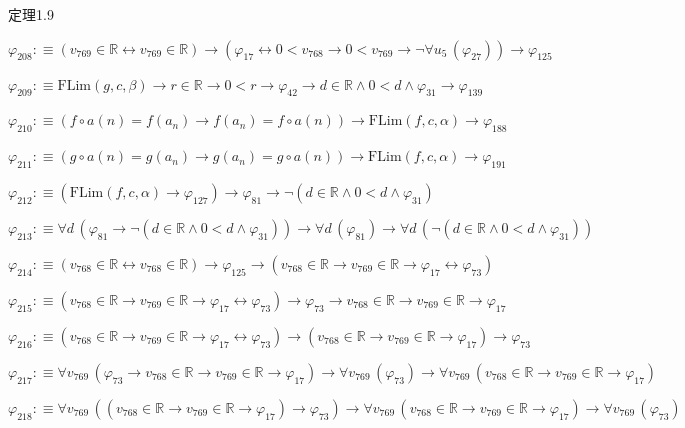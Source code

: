 \begin{fullproof}{定理1.9}
\begin{abbrevlist}
\item $\varphi_{208} :\equiv (v_{769} \in \mathbb{R} \leftrightarrow v_{769} \in \mathbb{R}) \to (\varphi_{17} \leftrightarrow 0 < v_{768} \to 0 < v_{769} \to \neg \forall u_{5}\,(\varphi_{27})) \to \varphi_{125}$
\item $\varphi_{209} :\equiv \mathrm{FLim}(g,c,\beta) \to r \in \mathbb{R} \to 0 < r \to \varphi_{42} \to d \in \mathbb{R} \land 0 < d \land \varphi_{31} \to \varphi_{139}$
\item $\varphi_{210} :\equiv (f \circ a(n) = f(a_{n}) \to f(a_{n}) = f \circ a(n)) \to \mathrm{FLim}(f,c,\alpha) \to \varphi_{188}$
\item $\varphi_{211} :\equiv (g \circ a(n) = g(a_{n}) \to g(a_{n}) = g \circ a(n)) \to \mathrm{FLim}(f,c,\alpha) \to \varphi_{191}$
\item $\varphi_{212} :\equiv (\mathrm{FLim}(f,c,\alpha) \to \varphi_{127}) \to \varphi_{81} \to \neg (d \in \mathbb{R} \land 0 < d \land \varphi_{31})$
\item $\varphi_{213} :\equiv \forall d\,(\varphi_{81} \to \neg (d \in \mathbb{R} \land 0 < d \land \varphi_{31})) \to \forall d\,(\varphi_{81}) \to \forall d\,(\neg (d \in \mathbb{R} \land 0 < d \land \varphi_{31}))$
\item $\varphi_{214} :\equiv (v_{768} \in \mathbb{R} \leftrightarrow v_{768} \in \mathbb{R}) \to \varphi_{125} \to (v_{768} \in \mathbb{R} \to v_{769} \in \mathbb{R} \to \varphi_{17} \leftrightarrow \varphi_{73})$
\item $\varphi_{215} :\equiv (v_{768} \in \mathbb{R} \to v_{769} \in \mathbb{R} \to \varphi_{17} \leftrightarrow \varphi_{73}) \to \varphi_{73} \to v_{768} \in \mathbb{R} \to v_{769} \in \mathbb{R} \to \varphi_{17}$
\item $\varphi_{216} :\equiv (v_{768} \in \mathbb{R} \to v_{769} \in \mathbb{R} \to \varphi_{17} \leftrightarrow \varphi_{73}) \to (v_{768} \in \mathbb{R} \to v_{769} \in \mathbb{R} \to \varphi_{17}) \to \varphi_{73}$
\item $\varphi_{217} :\equiv \forall v_{769}\,(\varphi_{73} \to v_{768} \in \mathbb{R} \to v_{769} \in \mathbb{R} \to \varphi_{17}) \to \forall v_{769}\,(\varphi_{73}) \to \forall v_{769}\,(v_{768} \in \mathbb{R} \to v_{769} \in \mathbb{R} \to \varphi_{17})$
\item $\varphi_{218} :\equiv \forall v_{769}\,((v_{768} \in \mathbb{R} \to v_{769} \in \mathbb{R} \to \varphi_{17}) \to \varphi_{73}) \to \forall v_{769}\,(v_{768} \in \mathbb{R} \to v_{769} \in \mathbb{R} \to \varphi_{17}) \to \forall v_{769}\,(\varphi_{73})$

\end{abbrevlist}
\end{fullproof}
